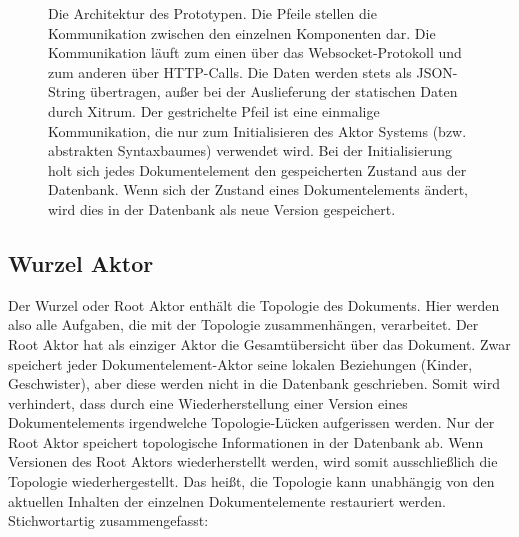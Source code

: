  
\begin{figure}[h!]
\centering
\advance\leftskip-2.5cm
\caption[Architektur des Prototypen]{ Die Architektur des Prototypen. Die Pfeile stellen die Kommunikation zwischen den einzelnen Komponenten dar. Die Kommunikation läuft zum einen über das Websocket-Protokoll und zum anderen über HTTP-Calls. Die Daten werden stets als JSON-String übertragen, außer bei der Auslieferung der statischen Daten durch Xitrum. Der gestrichelte Pfeil ist eine einmalige Kommunikation, die nur zum Initialisieren des Aktor Systems (bzw. abstrakten Syntaxbaumes) verwendet wird. Bei der Initialisierung holt sich jedes Dokumentelement den gespeicherten Zustand aus der Datenbank. Wenn sich der Zustand eines Dokumentelements ändert, wird dies in der Datenbank als neue Version gespeichert. }\label{architektur-fig}
\end{figure}
 
\subsection{Wurzel Aktor}\label{}
 
Der Wurzel oder Root Aktor enthält die Topologie des Dokuments. Hier werden also alle Aufgaben, die mit der Topologie zusammenhängen, verarbeitet. Der Root Aktor hat als einziger Aktor die Gesamtübersicht über das Dokument. Zwar speichert jeder Dokumentelement-Aktor seine lokalen Beziehungen (Kinder, Geschwister), aber diese werden nicht in die Datenbank geschrieben. Somit wird verhindert, dass durch eine Wiederherstellung einer Version eines Dokumentelements irgendwelche Topologie-Lücken aufgerissen werden. Nur der Root Aktor speichert topologische Informationen in der Datenbank ab. Wenn Versionen des Root Aktors wiederherstellt werden, wird somit ausschließlich die Topologie wiederhergestellt. Das heißt, die Topologie kann unabhängig von den aktuellen Inhalten der einzelnen Dokumentelemente restauriert werden. Stichwortartig zusammengefasst:

